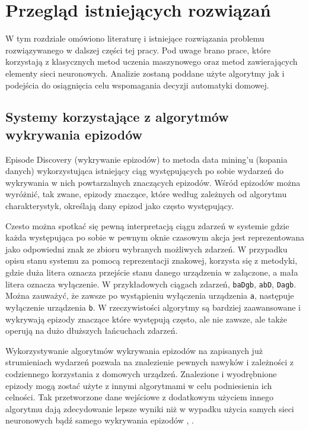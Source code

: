 
\chapter{Przegląd istniejących rozwiązań}

W tym rozdziale omówiono literaturę i istniejące rozwiązania problemu rozwiązywanego w dalszej części tej pracy. Pod uwage brano prace, które korzystają z klasycznych metod uczenia maszynowego oraz metod zawierających elementy sieci neuronowych. Analizie zostaną poddane użyte algorytmy jak i podejścia do osiągnięcia celu wspomagania decyzji automatyki domowej.


\section{Systemy korzystające z algorytmów wykrywania epizodów}
\label{section:episode_discovery}
Episode Discovery (wykrywanie epizodów) to metoda data mining'u (kopania danych) wykorzystująca istniejący ciąg występujących po sobie wydarzeń do wykrywania w nich powtarzalnych znaczących epizodów. Wśród epizodów można wyróżnić, tak zwane, epizody znaczące, które według zależnych od algorytmu charakterystyk, określają dany epizod jako często występujący.

Czesto można spotkać się pewną interpretacją ciągu zdarzeń w systemie gdzie każda występująca po sobie w pewnym oknie czasowym akcja jest reprezentowana jako odpowiedni znak ze zbioru wybranych możliwych zdarzeń. W przypadku opisu stanu systemu za pomocą reprezentacji znakowej, korzysta się z metodyki, gdzie duża litera oznacza przejście stanu danego urządzenia w załączone, a mała litera oznacza wyłączenie. W przykładowych ciągach zdarzeń, \verb|baDgb|, \verb|abD|, \verb|Dagb|. Można zauważyć, że zawsze po wystąpieniu wyłączenia urządzenia \verb|a|, następuje wyłączenie urządzenia \verb|b|. W rzeczywistości algorytmy są bardziej zaawansowane i wykrywają epizody znaczące które występują często, ale nie zawsze, ale także operują na dużo dłuższych łańcuchach zdarzeń.

Wykorzystywanie algorytmów wykrywania epizodów na zapisanych już strumieniach wydarzeń pozwala na znalezienie pewnych nawyków i zależności z codziennego korzystania z domowych urządzeń. Znalezione i wyodrębnione epizody mogą zostać użyte z innymi algorytmami w celu podniesienia ich celności. Tak przetworzone dane wejściowe z dodatkowym użyciem innego algorytmu dają zdecydowanie lepsze wyniki niż w wypadku użycia samych sieci neuronowych bądź samego wykrywania epizodów \cite{episode_discovery_1}, \cite{episode_discovery_2}. 


